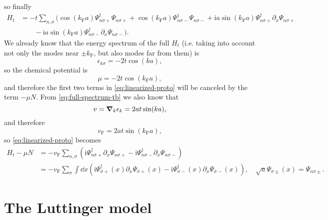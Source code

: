 \documentclass[hyperref, a4paper]{article}
\newcommand*{\ii}{\mathrm{i}}
\begin{document}
so finally 
\begin{equation}
    \begin{aligned}
        H_t &= - t \sum_{n, \sigma} (\cos(k_\text{F} a) \Psi^\dagger_{n \sigma +} \Psi_{n \sigma +}
        + \cos(k_\text{F} a) \Psi^\dagger_{n \sigma -} \Psi_{n \sigma -}
        + \ii a\sin(k_\text{F} a) \Psi_{n \sigma +}^\dagger \partial_x \Psi_{n \sigma +} \\
        &\quad \quad - \ii a\sin(k_\text{F} a) \Psi_{n \sigma -}^\dagger \partial_x \Psi_{n \sigma -}).
    \end{aligned}
    \label{eq:linearized-proto}
\end{equation}
We already know that the energy spectrum of the full $H_t$ (i.e. taking into account not only the modes 
near $\pm k_\text{F}$, but also modes far from them) is 
\begin{equation}
    \epsilon_{k \sigma} = - 2 t \cos(k a), 
    \label{eq:full-spectrum-tb}
\end{equation}
so the chemical potential is 
\begin{equation}
    \mu = - 2 t \cos (k_\text{F} a),
\end{equation}
and therefore the first two terms in \eqref{eq:linearized-proto} will be canceled by the term $- \mu N$.
From \eqref{eq:full-spectrum-tb} we also know that 
\begin{equation}
    v = \grad_{k} \epsilon_{k} = 2 a t \sin(k a),
\end{equation}
and therefore 
\begin{equation}
    v_\text{F} = 2 a t \sin(k_\text{F} a),
\end{equation}
so \eqref{eq:linearized-proto} becomes 
\begin{equation}
    \begin{aligned}
        H_t - \mu N &= - v_\text{F} \sum_{n, \sigma} (\ii \Psi_{n \sigma +}^\dagger \partial_x \Psi_{n \sigma +} - \ii \Psi_{n \sigma -}^\dagger \partial_x \Psi_{n \sigma -})  \\
        &= - v_\text{F} \sum_{\sigma} \int \dd{x} (\ii \Psi_{\sigma +}^\dagger(x) \partial_x \Psi_{\sigma +}(x) - \ii \Psi_{\sigma -}^\dagger(x) \partial_x \Psi_{\sigma -}(x) ), \quad \sqrt{a} \Psi_{\sigma \pm} (x) = \Psi_{n \sigma \pm}.
    \end{aligned} 
\end{equation}

\section{The Luttinger model}


 
\end{document}
